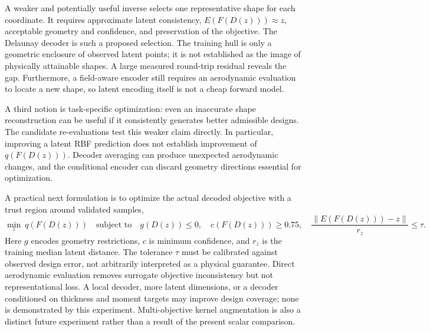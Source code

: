 \documentclass[11pt,a4paper]{article}
\begin{document}
A weaker and potentially useful inverse selects one representative shape for each coordinate. It requires approximate latent consistency, $E(F(D(z)))\approx z$, acceptable geometry and confidence, and preservation of the objective. The Delaunay decoder is such a proposed selection. The training hull is only a geometric enclosure of observed latent points; it is not established as the image of physically attainable shapes. A large measured round-trip residual reveals the gap. Furthermore, a field-aware encoder still requires an aerodynamic evaluation to locate a new shape, so latent encoding itself is not a cheap forward model.

A third notion is task-specific optimization: even an inaccurate shape reconstruction can be useful if it consistently generates better admissible designs. The candidate re-evaluations test this weaker claim directly. In particular, improving a latent RBF prediction does not establish improvement of $q(F(D(z)))$. Decoder averaging can produce unexpected aerodynamic changes, and the conditional encoder can discard geometry directions essential for optimization.

A practical next formulation is to optimize the actual decoded objective with a trust region around validated samples,
\[
 \min_{z}\ q(F(D(z)))\quad\text{subject to}\quad
 g(D(z))\leq0,\quad c(F(D(z)))\geq0.75,\quad
 \frac{\|E(F(D(z)))-z\|}{r_z}\leq\tau.
\]
Here $g$ encodes geometry restrictions, $c$ is minimum confidence, and $r_z$ is the training median latent distance. The tolerance $\tau$ must be calibrated against observed design error, not arbitrarily interpreted as a physical guarantee. Direct aerodynamic evaluation removes surrogate objective inconsistency but not representational loss. A local decoder, more latent dimensions, or a decoder conditioned on thickness and moment targets may improve design coverage; none is demonstrated by this experiment. Multi-objective kernel augmentation is also a distinct future experiment rather than a result of the present scalar comparison.
\end{document}

